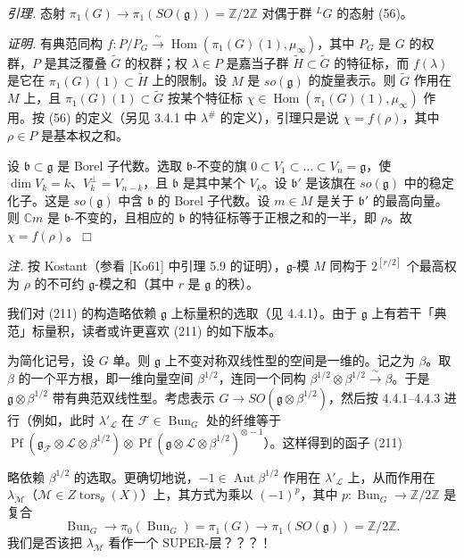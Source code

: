 
 \emph{引理.} 态射 $\pi_{1}(G)\to\pi_{1}(SO(\mathfrak{g}))=\mathbb{Z}/2\mathbb{Z}$ 对偶于群 ${}^{L}G$ 的态射 (56)。

\emph{证明.} 有典范同构 $f:P/P_{G}\xrightarrow{\ \sim\ }\operatorname{Hom}(\pi_{1}(G)(1),\mu_{\infty})$，其中 $P_{G}$ 是 $G$ 的权群，$P$ 是其泛覆叠 $\tilde{G}$ 的权群；权 $\lambda\in P$ 是嘉当子群 $\tilde{H}\subset\tilde{G}$ 的特征标，而 $f(\lambda)$ 是它在 $\pi_{1}(G)(1)\subset\tilde{H}$ 上的限制。设 $M$ 是 $so(\mathfrak{g})$ 的旋量表示。则 $\tilde{G}$ 作用在 $M$ 上，且 $\pi_{1}(G)(1)\subset\tilde{G}$ 按某个特征标 $\chi\in\operatorname{Hom}(\pi_{1}(G)(1),\mu_{\infty})$ 作用。按 (56) 的定义（另见 3.4.1 中 $\lambda^{\#}$ 的定义），引理只是说 $\chi=f(\rho)$，其中 $\rho\in P$ 是基本权之和。

设 $\mathfrak{b}\subset\mathfrak{g}$ 是 Borel 子代数。选取 $\mathfrak{b}$-不变的旗 $0\subset V_{1}\subset\ldots\subset V_{n}=\mathfrak{g}$，使 $\dim V_{k}=k$、$V_{k}^{\perp}=V_{n-k}$，且 $\mathfrak{b}$ 是其中某个 $V_{k}$。设 $\mathfrak{b}'$ 是该旗在 $so(\mathfrak{g})$ 中的稳定化子。这是 $so(\mathfrak{g})$ 中含 $\mathfrak{b}$ 的 Borel 子代数。设 $m\in M$ 是关于 $\mathfrak{b}'$ 的最高向量。则 $\mathbb{C}m$ 是 $\mathfrak{b}$-不变的，且相应的 $\mathfrak{b}$ 的特征标等于正根之和的一半，即 $\rho$。故 $\chi=f(\rho)$。\hfill$\Box$

\emph{注.} 按 Kostant（参看 [Ko61] 中引理 5.9 的证明），$\mathfrak{g}$-模 $M$ 同构于 $2^{[r/2]}$ 个最高权为 $\rho$ 的不可约 $\mathfrak{g}$-模之和（其中 $r$ 是 $\mathfrak{g}$ 的秩）。

 我们对 (211) 的构造略依赖 $\mathfrak{g}$ 上标量积的选取（见 4.4.1）。由于 $\mathfrak{g}$ 上有若干「典范」标量积，读者或许更喜欢 (211) 的如下版本。

为简化记号，设 $G$ 单。则 $\mathfrak{g}$ 上不变对称双线性型的空间是一维的。记之为 $\beta$。取 $\beta$ 的一个平方根，即一维向量空间 $\beta^{1/2}$，连同一个同构 $\beta^{1/2}\otimes\beta^{1/2}\xrightarrow{\ \sim\ }\beta$。于是 $\mathfrak{g}\otimes\beta^{1/2}$ 带有典范双线性型。考虑表示 $G\to SO(\mathfrak{g}\otimes\beta^{1/2})$，然后按 4.4.1–4.4.3 进行（例如，此时 $\lambda'_{\mathcal{L}}$ 在 $\mathcal{F}\in\operatorname{Bun}_{G}$ 处的纤维等于 $\operatorname{Pf}(\mathfrak{g}_{\mathcal{F}}\otimes\mathcal{L}\otimes\beta^{1/2})\otimes\operatorname{Pf}(\mathfrak{g}\otimes\mathcal{L}\otimes\beta^{1/2})^{\otimes-1}$）。这样得到的函子 (211)


略依赖 $\beta^{1/2}$ 的选取。更确切地说，$-1\in\operatorname{Aut}\beta^{1/2}$ 作用在 $\lambda'_{\mathcal{L}}$ 上，从而作用在 $\lambda_{\mathcal{M}}$（$\mathcal{M}\in Z\operatorname{tors}_{\theta}(X)$）上，其方式为乘以 $(-1)^{p}$，其中 $p:\operatorname{Bun}_{G}\to\mathbb{Z}/2\mathbb{Z}$ 是复合
\[
\operatorname{Bun}_{G}\to\pi_{0}(\operatorname{Bun}_{G})=\pi_{1}(G)\to\pi_{1}(SO(\mathfrak{g}))=\mathbb{Z}/2\mathbb{Z}.
\]
我们是否该把 $\lambda_{\mathcal{M}}$ 看作一个 SUPER-层？？？！

